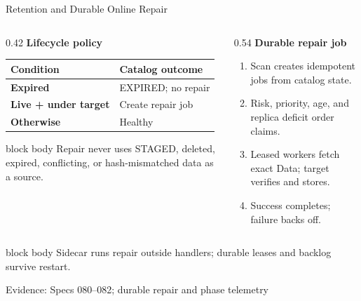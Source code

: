 \documentclass[aspectratio=169]{beamer}
\newcommand{\bluebox}[1]{%
  \begin{beamercolorbox}[rounded=true,shadow=false,sep=0.65em,wd=\linewidth]{block body}
  #1
  \end{beamercolorbox}
}
\newcommand{\evidence}[1]{%
  \vfill\par\noindent
  {\color{SoftGray}\tiny Evidence: #1}\par
}
\begin{document}
\begin{frame}{Retention and Durable Online Repair}
\footnotesize
\begin{columns}[T]
\begin{column}{0.42\textwidth}
\textbf{Lifecycle policy}
\vspace{0.25em}
\begin{tabularx}{\linewidth}{@{}>{\raggedright\arraybackslash\bfseries}p{2.25cm} X@{}}
\toprule
Condition & Catalog outcome \\
\midrule
Expired & \textcolor{AccentRed}{EXPIRED}; no repair \\
Live + under target & Create repair job \\
Otherwise & Healthy \\
\bottomrule
\end{tabularx}

\vspace{0.35em}
\bluebox{Repair never uses STAGED, deleted, expired, conflicting, or hash-mismatched data as a source.}
\end{column}
\begin{column}{0.54\textwidth}
\textbf{Durable repair job}
\begin{enumerate}
  \item Scan creates idempotent jobs from catalog state.
  \item Risk, priority, age, and replica deficit order claims.
  \item Leased workers fetch exact Data; target verifies and stores.
  \item Success completes; failure backs off.
\end{enumerate}
\end{column}
\end{columns}
\vspace{0.3em}
\bluebox{Sidecar runs repair outside handlers; durable leases and backlog survive restart.}
\evidence{Specs 080--082; durable repair and phase telemetry}
\end{frame}
\end{document}
